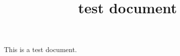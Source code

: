 \documentclass[a4paper]{article}
\title{test document}
\begin{document}
\maketitle

This is a test document.
\end{document}

